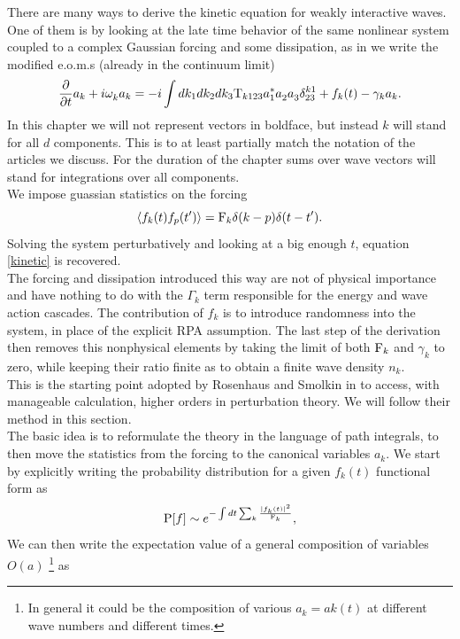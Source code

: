 There are many ways to derive the kinetic equation for weakly interactive waves. One of them is by looking at the late time behavior of the same nonlinear system
coupled to a complex Gaussian forcing and some dissipation, as in \cite{Zakharov1975} we write the modified e.o.m.s (already in the continuum limit)
\begin{equation}
    \frac{\partial}{\partial t} a_k + i \omega^{}_k a_k = -i \int dk_1 dk_2 dk_3 \mathrm{T}_{k123} a_1^*a_2^{}a_3^{} \delta^{k1}_{23} + f_k(t) - \gamma_k a_k.
    \label{eoms}
\end{equation}
In this chapter we will not represent vectors in boldface, but instead $k$ will stand for all $d$ components. This is to at least partially match the 
notation of the articles we discuss. For the duration of the chapter sums over wave vectors will stand for integrations over all components. \\ 
We impose guassian statistics on the forcing
\begin{equation}
    \langle f_k(t)f_p(t')\rangle = \mathrm{F}_k \delta(k-p)\delta(t-t').
\end{equation}
Solving the system perturbatively and looking at a big enough $t$, equation \eqref{kinetic} is recovered. \\
The forcing and dissipation introduced this way are not of physical importance and have nothing to do with the $\Gamma_k$ term responsible 
for the energy and wave action cascades. The contribution of $f_k$ is to introduce randomness into the system, in place of the explicit RPA assumption. 
The last step of the derivation then removes this nonphysical elements by taking the limit of both $\mathrm{F}_k$ and $\gamma_k$ to zero, while keeping their ratio finite as
to obtain a finite wave density $n_k$. \\  
This is the starting point adopted by Rosenhaus and Smolkin in \cite{Rosenhaus2023} to access, with manageable calculation, higher orders in perturbation theory. We will 
follow their method in this section.\\
The basic idea is to reformulate the theory in the language of path integrals, to then move the statistics from the forcing to the canonical variables $a_k^{}$. We start by
explicitly writing the probability distribution for a given $f_k(t)$ functional form as 
\begin{equation}  
    \mathrm{P}[f] \sim e^{-\int dt \sum_k \frac{|f_k(t)|^2}{\mathrm{F}_k}},
\end{equation}
We can then write the expectation value of a general composition of variables $O(a)$ \footnote{
    In general it could be the composition of various $a_k^{} = ak(t)$ at different wave numbers and different times.
} as 
